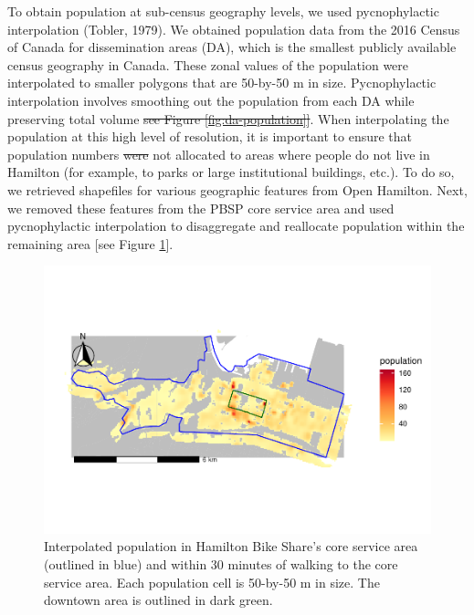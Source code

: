 \documentclass[]{elsarticle} %
\providecommand{\DIFaddtex}[1]{{\protect\color{blue}\uwave{#1}}} %
\providecommand{\DIFdeltex}[1]{{\protect\color{red}\sout{#1}}}                      %
\providecommand{\DIFaddbegin}{} %
\providecommand{\DIFaddend}{} %
\providecommand{\DIFdelbegin}{} %
\providecommand{\DIFdelend}{} %
\providecommand{\DIFaddbeginFL}{} %
\providecommand{\DIFaddendFL}{} %
\providecommand{\DIFdelbeginFL}{} %
\providecommand{\DIFdelendFL}{} %
\providecommand{\DIFadd}[1]{\texorpdfstring{\DIFaddtex{#1}}{#1}} %
\providecommand{\DIFdel}[1]{\texorpdfstring{\DIFdeltex{#1}}{}} %
\newcommand{\DIFscaledelfig}{0.5}
\newlength{\DIFdelgraphicswidth} %
\newlength{\DIFdelgraphicsheight} %
\newcommand{\DIFaddincludegraphics}[2][]{{\color{blue}\fbox{\DIFOincludegraphics[#1]{#2}}}} %
\newcommand{\DIFdelincludegraphics}[2][]{%
\sbox{\DIFdelgraphicsbox}{\DIFOincludegraphics[#1]{#2}}%
\settoboxwidth{\DIFdelgraphicswidth}{\DIFdelgraphicsbox} %
\settoboxtotalheight{\DIFdelgraphicsheight}{\DIFdelgraphicsbox} %
\scalebox{\DIFscaledelfig}{%
\parbox[b]{\DIFdelgraphicswidth}{\usebox{\DIFdelgraphicsbox}\\[-\baselineskip] \rule{\DIFdelgraphicswidth}{0em}}\llap{\resizebox{\DIFdelgraphicswidth}{\DIFdelgraphicsheight}{%
\setlength{\unitlength}{\DIFdelgraphicswidth}%
\begin{picture}(1,1)%
\thicklines\linethickness{2pt} %
{\color[rgb]{1,0,0}\put(0,0){\framebox(1,1){}}}%
{\color[rgb]{1,0,0}\put(0,0){\line( 1,1){1}}}%
{\color[rgb]{1,0,0}\put(0,1){\line(1,-1){1}}}%
\end{picture}%
}\hspace*{3pt}}} %
} %
\DeclareRobustCommand{\DIFaddbegin}{\DIFOaddbegin \let\includegraphics\DIFaddincludegraphics} %
\DeclareRobustCommand{\DIFaddend}{\DIFOaddend \let\includegraphics\DIFOincludegraphics} %
\DeclareRobustCommand{\DIFdelbegin}{\DIFOdelbegin \let\includegraphics\DIFdelincludegraphics} %
\DeclareRobustCommand{\DIFdelend}{\DIFOaddend \let\includegraphics\DIFOincludegraphics} %
\DeclareRobustCommand{\DIFaddbeginFL}{\DIFOaddbeginFL \let\includegraphics\DIFaddincludegraphics} %
\DeclareRobustCommand{\DIFaddendFL}{\DIFOaddendFL \let\includegraphics\DIFOincludegraphics} %
\DeclareRobustCommand{\DIFdelbeginFL}{\DIFOdelbeginFL \let\includegraphics\DIFdelincludegraphics} %
\DeclareRobustCommand{\DIFdelendFL}{\DIFOaddendFL \let\includegraphics\DIFOincludegraphics} %
\begin{document}
To obtain population at sub-census geography levels, we used
pycnophylactic interpolation (Tobler, 1979). We obtained population data
from the 2016 Census of Canada for dissemination areas (DA), which is
the smallest publicly available census geography in Canada. These zonal
values of the population were interpolated to smaller polygons that are
50-by-50 m in size. Pycnophylactic interpolation involves smoothing out
the population from each DA while preserving total volume\DIFdelbegin %
\DIFdel{see Figure
\ref{fig:da-population}{]}}\DIFdelend . When
interpolating the population at this high level of resolution, it is
important to ensure that population numbers \DIFdelbegin \DIFdel{were }\DIFdelend \DIFaddbegin \DIFadd{are }\DIFaddend not allocated to areas
where people do not live in Hamilton (for example, to parks or large
institutional buildings, etc.). To do so, we retrieved shapefiles for
various geographic features from Open Hamilton. Next, we removed these
features from the PBSP core service area and used pycnophylactic
interpolation to disaggregate and reallocate population within the
remaining area {[}see Figure \ref{fig:interpolated-population}{]}.

\begin{figure}

{\centering \DIFdelbeginFL %
\DIFdelendFL \DIFaddbeginFL \includegraphics[width=0.9\linewidth]{Bike-share-spatial-equity_files/figure-latex/interpolated-population-1} 
\DIFaddendFL 

}

\caption{Interpolated population in Hamilton Bike Share's core service area (outlined in blue) and within 30 minutes of walking to the core service area. Each population cell is 50-by-50 m in size. The downtown area is outlined in dark green.}\label{fig:interpolated-population}
\end{figure}
\end{document}
